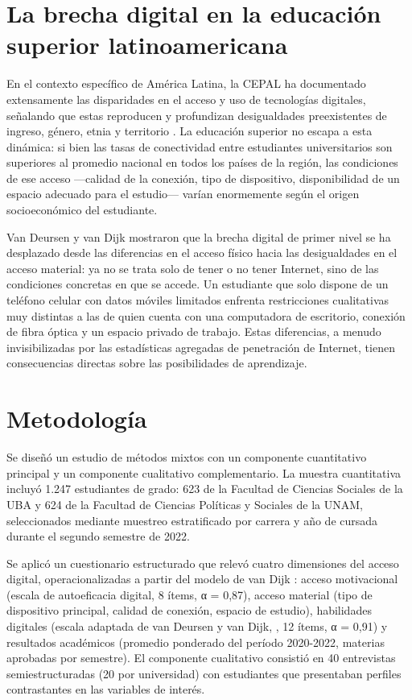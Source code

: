 \documentclass{article}
\begin{document}
\section{La brecha digital en la educación superior latinoamericana}
En el contexto específico de América Latina, la CEPAL ha documentado extensamente las disparidades en el acceso y uso de tecnologías digitales, señalando que estas reproducen y profundizan desigualdades preexistentes de ingreso, género, etnia y territorio \autocite{2566-CEPAL2021}. La educación superior no escapa a esta dinámica: si bien las tasas de conectividad entre estudiantes universitarios son superiores al promedio nacional en todos los países de la región, las condiciones de ese acceso —calidad de la conexión, tipo de dispositivo, disponibilidad de un espacio adecuado para el estudio— varían enormemente según el origen socioeconómico del estudiante.

Van Deursen y van Dijk \autocite*{2564-VANDEURSEN2019} mostraron que la brecha digital de primer nivel se ha desplazado desde las diferencias en el acceso físico hacia las desigualdades en el acceso material: ya no se trata solo de tener o no tener Internet, sino de las condiciones concretas en que se accede. Un estudiante que solo dispone de un teléfono celular con datos móviles limitados enfrenta restricciones cualitativas muy distintas a las de quien cuenta con una computadora de escritorio, conexión de fibra óptica y un espacio privado de trabajo. Estas diferencias, a menudo invisibilizadas por las estadísticas agregadas de penetración de Internet, tienen consecuencias directas sobre las posibilidades de aprendizaje.


\section{Metodología}
Se diseñó un estudio de métodos mixtos con un componente cuantitativo principal y un componente cualitativo complementario. La muestra cuantitativa incluyó 1.247 estudiantes de grado: 623 de la Facultad de Ciencias Sociales de la UBA y 624 de la Facultad de Ciencias Políticas y Sociales de la UNAM, seleccionados mediante muestreo estratificado por carrera y año de cursada durante el segundo semestre de 2022.

Se aplicó un cuestionario estructurado que relevó cuatro dimensiones del acceso digital, operacionalizadas a partir del modelo de van Dijk \autocite*{2563-VANDIJK2020}: acceso motivacional (escala de autoeficacia digital, 8 ítems, α = 0,87), acceso material (tipo de dispositivo principal, calidad de conexión, espacio de estudio), habilidades digitales (escala adaptada de van Deursen y van Dijk, \autocite*{2564-VANDEURSEN2019}, 12 ítems, α = 0,91) y resultados académicos (promedio ponderado del período 2020-2022, materias aprobadas por semestre). El componente cualitativo consistió en 40 entrevistas semiestructuradas (20 por universidad) con estudiantes que presentaban perfiles contrastantes en las variables de interés.
\end{document}
